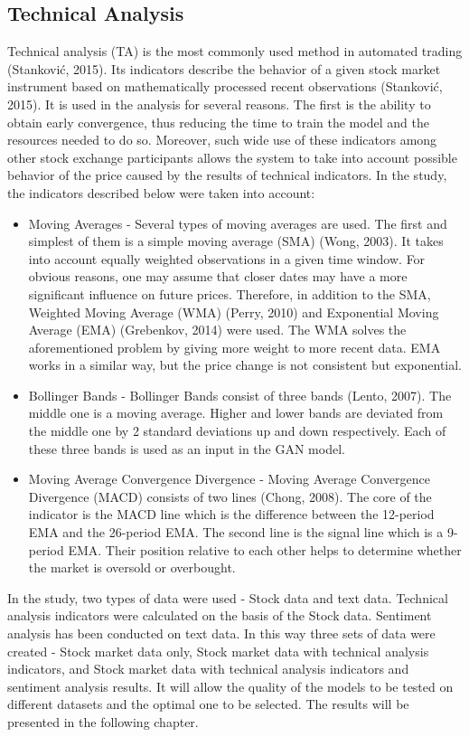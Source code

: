 \documentclass[11pt]{article} %
\begin{document}
\subsection{Technical Analysis}
Technical analysis (TA) is the most commonly used method in automated trading (Stanković, 2015). Its indicators describe the behavior of a given stock market instrument based on mathematically processed recent observations (Stanković, 2015). It is used in the analysis for several reasons. The first is the ability to obtain early convergence, thus reducing the time to train the model and the resources needed to do so. Moreover, such wide use of these indicators among other stock exchange participants allows the system to take into account possible behavior of the price caused by the results of technical indicators. In the study, the indicators described below were taken into account: 
\begin{itemize}
\item Moving Averages - Several types of moving averages are used. The first and simplest of them is a simple moving average (SMA) (Wong, 2003). It takes into account equally weighted observations in a given time window. For obvious reasons, one may assume that closer dates may have a more significant influence on future prices. Therefore, in addition to the SMA, Weighted Moving Average (WMA) (Perry, 2010) and Exponential Moving Average (EMA) (Grebenkov, 2014) were used. The WMA solves the aforementioned problem by giving more weight to more recent data. EMA works in a similar way, but the price change is not consistent but exponential.

\item Bollinger Bands - Bollinger Bands consist of three bands (Lento, 2007). The middle one is a moving average. Higher and lower bands are deviated from the middle one by 2 standard deviations up and down respectively. Each of these three bands is used as an input in the GAN model.

\item Moving Average Convergence Divergence - Moving Average Convergence Divergence (MACD) consists of two lines (Chong, 2008). The core of the indicator is the MACD line which is the difference between the 12-period EMA and the 26-period EMA. The second line is the signal line which is a 9-period EMA. Their position relative to each other helps to determine whether the market is oversold or overbought.
\end{itemize}

In the study, two types of data were used - Stock data and text data. Technical analysis indicators were calculated on the basis of the Stock data. Sentiment analysis has been conducted on text data. In this way three sets of data were created - Stock market data only, Stock market data with technical analysis indicators, and Stock market data with technical analysis indicators and sentiment analysis results. It will allow the quality of the models to be tested on different datasets and the optimal one to be selected. The results will be presented in the following chapter. 
\end{document}

